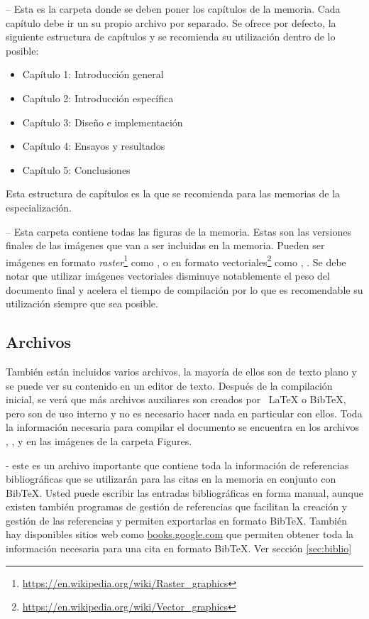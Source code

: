  -- Esta es la carpeta donde se deben poner los capítulos de la memoria. Cada capítulo debe ir un su propio archivo  por separado.  Se ofrece por defecto, la siguiente estructura de capítulos y se recomienda su utilización dentro de lo posible:

\begin{itemize}
\item Capítulo 1: Introducción general	
\item Capítulo 2: Introducción específica
\item Capítulo 3: Diseño e implementación
\item Capítulo 4: Ensayos y resultados
\item Capítulo 5: Conclusiones

\end{itemize}

Esta estructura de capítulos es la que se recomienda para las memorias de la especialización.

 -- Esta carpeta contiene todas las figuras de la memoria.  Estas son las versiones finales de las imágenes que van a ser incluidas en la memoria.  Pueden ser imágenes en formato \textit{raster}\footnote{\url{https://en.wikipedia.org/wiki/Raster_graphics}} como ,  o en formato vectoriales\footnote{\url{https://en.wikipedia.org/wiki/Vector_graphics}} como , .  Se debe notar que utilizar imágenes vectoriales disminuye notablemente el peso del documento final y acelera el tiempo de compilación por lo que es recomendable su utilización siempre que sea posible.

\subsection{Archivos}

También están incluidos varios archivos, la mayoría de ellos son de texto plano y se puede ver su contenido en un editor de texto. Después de la compilación inicial, se verá que más archivos auxiliares son creados por \ LaTeX{} o BibTeX, pero son de uso interno y no es necesario hacer nada en particular con ellos.  Toda la información necesaria para compilar el documento se encuentra en los archivos , ,  y en las imágenes de la carpeta Figures.

 - este es un archivo importante que contiene toda la información de referencias bibliográficas que se utilizarán para las citas en la memoria en conjunto con BibTeX. Usted puede escribir las entradas bibliográficas en forma manual, aunque existen también programas de gestión de referencias que facilitan la creación y gestión de las referencias y permiten exportarlas en formato BibTeX.  También hay disponibles sitios web como \url{books.google.com} que permiten obtener toda la información necesaria para una cita en formato BibTeX. Ver sección \ref{sec:biblio}

